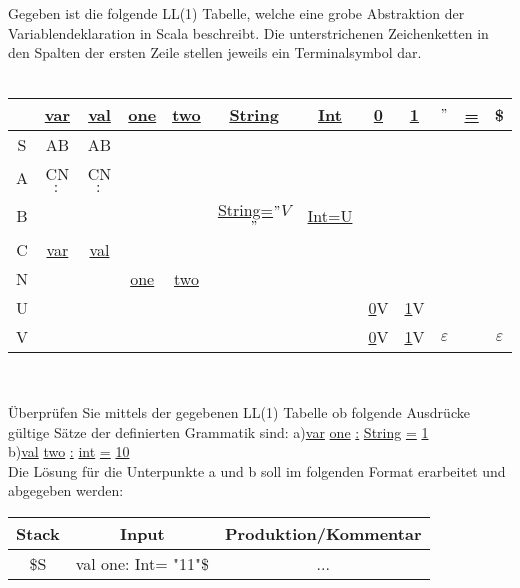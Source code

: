 \documentclass[12pt,runningheads,a4paper]{llncs}
\begin{document}
Gegeben ist die folgende LL(1) Tabelle, welche eine grobe Abstraktion der Variablendeklaration in Scala beschreibt. Die unterstrichenen Zeichenketten in den Spalten der ersten Zeile stellen jeweils ein Terminalsymbol dar.\\
\\
\begin{center}
\begin{tabular}{ |c|c|c|c|c|c|c|c|c|c|c|c| }
 \hline
 &\underline{var} &\underline{val} &\underline{one} &\underline{two} &\underline{String} &\underline{Int} &\underline{0} &\underline{1} &\underline{$"$} &\underline{=} &\$\\ 
 \hline
 S &AB &AB & & & & & & & & & \\ 
  \hline
 A &CN\underline{$:$} &CN\underline{$:$} & & & & & & & & & \\
  \hline
 B & & & & &\underline{String}\underline{=}\underline{$"$}\underline{$V$}\underline{$"$} &\underline{Int}\underline{=}\underline{U} & & & & & \\
  \hline
 C &\underline{var} &\underline{val} & & & & & & & & & \\
  \hline
 N & & &\underline{one} &\underline{two} & & & & & & &  \\
  \hline
 U & & & & & & &\underline{0}V &\underline{1}V & & &\\
  \hline
V & & & & & & &\underline{0}V &\underline{1}V &$\varepsilon$ & &$\varepsilon$\\
   \hline
 \end{tabular}\\
 \end{center}
 \"Uberpr\"ufen Sie mittels der gegebenen LL(1) Tabelle ob folgende Ausdr\"ucke g\"ultige S\"atze der definierten
Grammatik sind:%
a)\underline{var} \underline{one} \underline{:} \underline{String} \underline{=} \underline{1}\\
b)\underline{val} \underline{two} \underline{:} \underline{int} \underline{=} \underline{10}\\
Die L\"osung f\"ur die Unterpunkte a und b soll im folgenden Format erarbeitet und abgegeben werden:\\
\begin{center}
\begin{tabular}{ |c|c|c|  }
 \hline
 Stack&Input &Produktion/Kommentar\\ 
 \hline
 \$S &val one: Int= "11"\$ &... \\
  \hline
 \end{tabular}\\
 \end{center}
\end{document}
